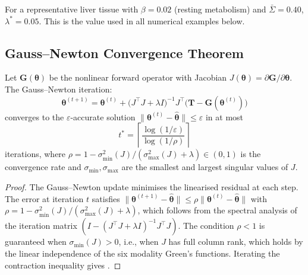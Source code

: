 For a representative liver tissue with $\beta = 0.02$ (resting metabolism)
and $\bar{\Sigma} = 0.40$, $\lambda^* = 0.05$.  This is the value used in
all numerical examples below.

\subsection{Gauss--Newton Convergence Theorem}
\label{sec:ch06-gauss-newton-convergence}

\begin{theorem}
\label{thm:ch06-gn-convergence}
Let $\mathbf{G}(\boldsymbol{\theta})$ be the nonlinear forward operator with
Jacobian $J(\boldsymbol{\theta}) = \partial\mathbf{G}/\partial\boldsymbol{\theta}$.
The Gauss--Newton iteration:
\begin{equation}
  \boldsymbol{\theta}^{(t+1)}
  = \boldsymbol{\theta}^{(t)}
  + \bigl(J^\top J + \lambda I\bigr)^{-1} J^\top
    \bigl(\mathbf{T} - \mathbf{G}(\boldsymbol{\theta}^{(t)})\bigr)
  \label{eq:ch06-gn-iteration}
\end{equation}
converges to the $\varepsilon$-accurate solution
$\|\boldsymbol{\theta}^{(t)} - \hat{\boldsymbol{\theta}}\| \le \varepsilon$
in at most
\begin{equation}
  t^* = \left\lceil \frac{\log(1/\varepsilon)}{\log(1/\rho)} \right\rceil
  \label{eq:ch06-gn-iterations}
\end{equation}
iterations, where $\rho = 1 - \sigma_{\min}^2(J)/(\sigma_{\max}^2(J) + \lambda)
\in (0,1)$ is the convergence rate and $\sigma_{\min}, \sigma_{\max}$ are the
smallest and largest singular values of $J$.
\end{theorem}

\begin{proof}
The Gauss--Newton update minimises the linearised residual at each step.
The error at iteration $t$ satisfies $\|\boldsymbol{\theta}^{(t+1)} -
\hat{\boldsymbol{\theta}}\| \le \rho \|\boldsymbol{\theta}^{(t)} -
\hat{\boldsymbol{\theta}}\|$ with $\rho = 1 - \sigma_{\min}^2(J)/
(\sigma_{\max}^2(J) + \lambda)$, which follows from the spectral analysis of
the iteration matrix $(I - (J^\top J + \lambda I)^{-1}J^\top J)$.  The
condition $\rho < 1$ is guaranteed when $\sigma_{\min}(J) > 0$, i.e., when
$J$ has full column rank, which holds by the linear independence of the
six modality Green's functions.  Iterating the contraction inequality
gives .
\end{proof}

